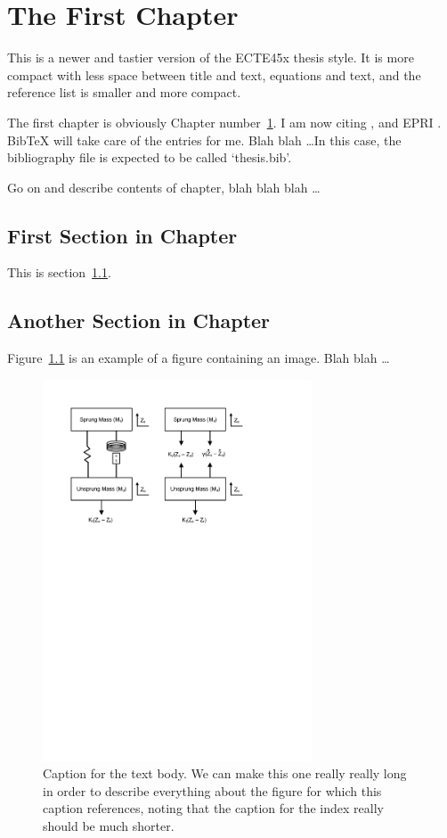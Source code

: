 \chapter{The First Chapter}\label{chap:first}

This is a newer and tastier version of the ECTE45x thesis style. It is more
compact with less space between title and text, equations and text, and the
reference list is smaller and more compact. 

The first chapter is obviously Chapter number~\ref{chap:first}. I am now
citing \citet{Honsinger71a}, \citet{Jovanovic95a} and EPRI \citep{EPRI01}.
BibTeX will take care of the entries for me.  Blah blah \ldots In this case,
the bibliography file is expected to be called `thesis.bib'.

Go on and describe contents of chapter, blah blah blah \ldots

\section{First Section in Chapter}\label{first:sec}

This is section~\ref{first:sec}.

\section{Another Section in Chapter}

Figure~\ref{fig:example} is an example of a figure containing an image.
Blah blah \ldots

\begin{figure}[!h]
\begin{singlespace}
\centering
\includegraphics[width=8cm]{Figures/FBD.pdf}
\caption[Caption for the List of Figures.]{Caption for the text body. We can
make this one really really long in order to describe everything
about the figure for which this caption references, noting that
the caption for the index really should be much shorter.}
\label{fig:example}
\end{singlespace}
\end{figure}

